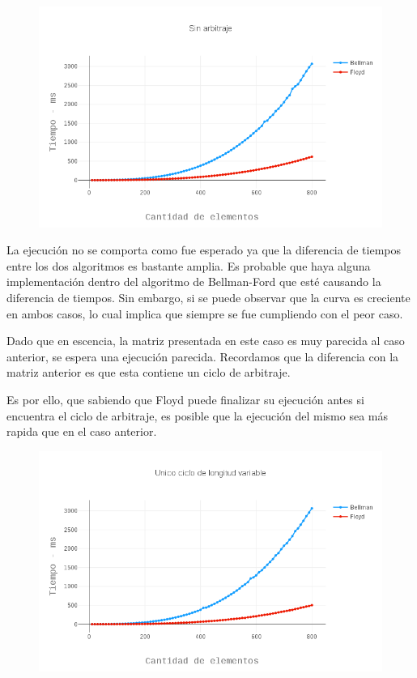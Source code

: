 \begin{figure}[H]
  \begin{center}
	\includegraphics[scale=0.4]{images/experimentos/arbitraje/sinArbitraje.png}
  \end{center}
\end{figure}

La ejecución no se comporta como fue esperado ya que la diferencia de tiempos entre los dos algoritmos es bastante amplia. Es probable que haya alguna implementación dentro del algoritmo de Bellman-Ford que esté causando la diferencia de tiempos. Sin embargo, si se puede observar que la curva es creciente en ambos casos, lo cual implica que siempre se fue cumpliendo con el peor caso.


 \label{unicoCiclo}
Dado que en escencia, la matriz presentada en este caso es muy parecida al caso anterior, se espera una ejecución parecida. Recordamos que la diferencia con la matriz anterior es que esta contiene un ciclo de arbitraje.

Es por ello, que sabiendo que Floyd puede finalizar su ejecución antes si encuentra el ciclo de arbitraje, es posible que la ejecución del mismo sea más rapida que en el caso anterior.

\begin{figure}[H]
  \begin{center}
	\includegraphics[scale=0.4]{images/experimentos/arbitraje/unicoCicloLongitudVariable.png}
  \end{center}
\end{figure}

